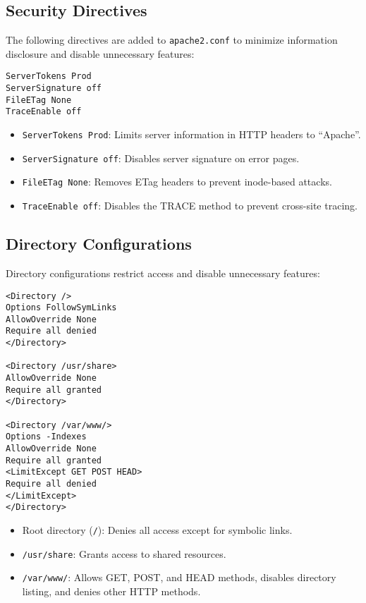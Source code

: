 \documentclass[12pt]{report}
\begin{document}
\subsection*{Security Directives}

The following directives are added to \texttt{apache2.conf} to minimize information disclosure and disable unnecessary features:

\begin{lstlisting}[caption={Security Directives in apache2.conf}]
ServerTokens Prod
ServerSignature off
FileETag None
TraceEnable off
\end{lstlisting}

\begin{itemize}
\item \texttt{ServerTokens Prod}: Limits server information in HTTP headers to ``Apache''.
\item \texttt{ServerSignature off}: Disables server signature on error pages.
\item \texttt{FileETag None}: Removes ETag headers to prevent inode-based attacks.
\item \texttt{TraceEnable off}: Disables the TRACE method to prevent cross-site tracing.
\end{itemize}

\subsection*{Directory Configurations}
Directory configurations restrict access and disable unnecessary features:

\begin{lstlisting}[caption={Directory Configurations in apache2.conf}]
<Directory />
Options FollowSymLinks
AllowOverride None
Require all denied
</Directory>

<Directory /usr/share>
AllowOverride None
Require all granted
</Directory>

<Directory /var/www/>
Options -Indexes
AllowOverride None
Require all granted
<LimitExcept GET POST HEAD>
Require all denied
</LimitExcept>
</Directory>
\end{lstlisting}

\begin{itemize}
\item Root directory (\texttt{/}): Denies all access except for symbolic links.
\item \texttt{/usr/share}: Grants access to shared resources.
\item \texttt{/var/www/}: Allows GET, POST, and HEAD methods, disables directory listing, and denies other HTTP methods.
\end{itemize}
\end{document}
